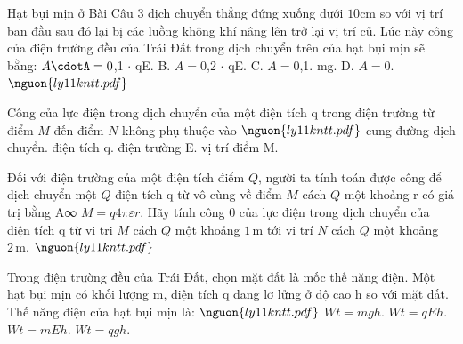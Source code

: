

\begin{bt}
Hạt bụi mịn ở Bài Câu 3 dịch chuyển thẳng đứng xuống dưới $10 \mathrm{cm}$ so với vị trí ban đầu sau đó lại bị các luồng không khí nâng lên trở lại vị trí cũ. Lúc này công của điện trường đều của Trái Đất trong dịch chuyển trên của hạt bụi mịn sẽ bằng: $A\cdotA = 0$,1 $\cdot$  qE. B. $A = 0$,2 $\cdot$  qE. C. $A = 0$,1. mg. D. $A = 0$. $\nguon{ly11 kntt.pdf}$
\end{bt}

\begin{ex}
Công của lực điện trong dịch chuyển của một điện tích q trong điện trường từ điểm $M$ đến điểm $N$ không phụ thuộc vào $\nguon{ly11 kntt.pdf}$
\choice
{\True cung đường dịch chuyển.}
{điện tích q.}
{điện trường E.}
{vị trí điểm M.}
\end{ex}

\begin{ex}
Đối với điện trường của một điện tích điểm $Q$, người ta tính toán được công để dịch chuyển một $Q$ điện tích q từ vô cùng về điểm $M$ cách $Q$ một khoảng r có giá trị bằng A∞ $M = q 4\pi\varepsilon r$. Hãy tính công 0 của lực điện trong dịch chuyển của điện tích q từ vi tri $M$ cách $Q$ một khoảng $1\,\text{m}$ tới vi trí $N$ cách $Q$ một khoảng $2\,\text{m}$. $\nguon{ly11 kntt.pdf}$
\choiceTF

\end{ex}

\begin{ex}
Trong điện trường đều của Trái Đất, chọn mặt đất là mốc thế năng điện. Một hạt bụi mịn có khối lượng m, điện tích q đang lơ lửng ở độ cao h so với mặt đất. Thế năng điện của hạt bụi mịn là: $\nguon{ly11 kntt.pdf}$
\choice
{$Wt = mgh.$}
{\True $Wt = qEh.$}
{$Wt = mEh.$}
{$Wt = qgh.$}
\end{ex}

